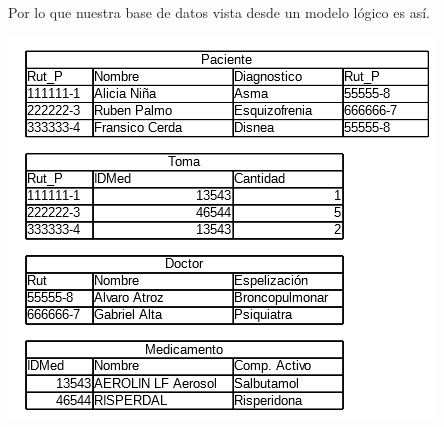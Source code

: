 \documentclass[11pt]{beamer}
\begin{document}
\begin{frame}

Por lo que nuestra base de datos vista desde un modelo lógico es así.

\begin{center}
\includegraphics[scale=.7]{images/tablafinal.png} 
\end{center}
\end{frame}
\end{document}
